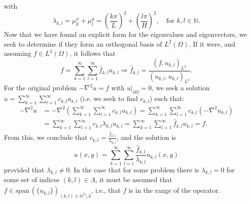 with
\begin{equation*}
    \lambda_{k,l}= \mu_{k}^{x}+\mu_{l}^{y}=\left(\frac{k\pi}{L}\right)^{2}+\left(\frac{l\pi}{H}\right)^{2}, \quad \text{for } k,l \in\mathbb{N}. 
\end{equation*}
Now that we have found an explicit form for the eigenvalues and eigenvectors, we seek to determine if they form an orthogonal basis of $L^{2}(\Omega)$. If it were, and assuming $f\in L^{2}(\Omega)$, it follows that
\begin{equation*}
    f=\sum_{k=1}^{\infty}\sum_{l=1}^{\infty}\hat{f}_{k,l}u_{k,l}\Rightarrow\hat{f}_{k,l}=\frac{(f,u_{k,l})_{L^{2}}}{(u_{k,l},u_{k,l})_{L^{2}}}.
\end{equation*}
For the original problem $-\nabla^2u=f$ with $u|_{\partial\Omega}=0$, we seek a solution $u=\sum_{k=1}^{\infty}\sum_{l=1}^{\infty}c_{k,l}u_{k,l}$ (i.e. we seek to find $c_{k,l}$) such that: 
\begin{align*}
    -\nabla^{2}u &=-\nabla^{2}\left(\sum_{k=1}^{\infty}\sum_{l=1}^{\infty}c_{k,l}u_{k,l}\right)=\sum_{k=1}^{\infty}\sum_{l=1}^{\infty}c_{k,l}(-\nabla^{2}u_{k,l}) \\
    &=\sum_{k=1}^{\infty}\sum_{l=1}^{\infty}c_{k,l}\lambda_{k,l}u_{k,l}=\sum_{k=1}^{\infty}\sum_{l=1}^{\infty}\hat{f}_{k,l}u_{k,l}=f.
\end{align*}
From this, we conclude that $c_{k,l}=\frac{\hat{f}_{k,l}}{\lambda_{k,l}}$, and the solution is
\begin{equation*}
    u(x,y)=\sum_{k=1}^{\infty}\sum_{l=1}^{\infty}\frac{\hat{f}_{k,l}}{\lambda_{k,l}}u_{k,l}(x,y)
\end{equation*}
provided that $\lambda_{k,l}\neq 0$.  In the case that for some problem there is $\lambda_{k,l}=0$ for some set of indices $(k,l)\in\Lambda$, it must be assumed that $f\in\overline{\text{span}\,(\{u_{k,l}\})}_{(k,l)\in\mathbb{N}^2\setminus\Lambda}$, i.e., that $f$ is in the range of the operator. 

